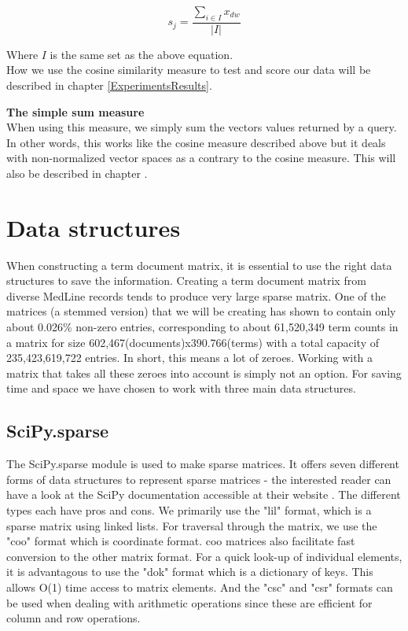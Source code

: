 \[
s_j = \frac{\sum_{i \in I} x_{dw}}{|I|}
\]

Where $I$ is the same set as the above equation. \\

How we use the cosine similarity measure to test and score our data will be described in chapter \ref{ExperimentsResults}. \\


\textbf{The simple sum measure\label{SimpleSum}} \\
When using this measure, we simply sum the vectors values returned by
a query. In other words, this works like the cosine measure described
above but it deals with non-normalized vector spaces as a contrary to
the cosine measure. This will also be described in chapter
.

\section{Data structures}

When constructing a term document matrix, it is essential to use the
right data structures to save the information. Creating a term
document matrix from diverse MedLine records tends to produce very
large sparse matrix. One of the matrices (a stemmed version) that we
will be creating has shown to contain only about 0.026\% non-zero
entries, corresponding to about 61,520,349 term counts in a matrix for
size 602,467(documents)x390.766(terms) with a total capacity of
235,423,619,722 entries. In short, this means a lot of zeroes. Working
with a matrix that takes all these zeroes into account is simply not
an option. For saving time and space we have chosen to work with three
main data structures.

\subsection{SciPy.sparse\label{SciPy_sparse}}

The SciPy.sparse module is used to make sparse matrices. It offers
seven different forms of data structures to represent sparse matrices
- the interested reader can have a look at the SciPy documentation
accessible at their website \cite{SciPy}. The different types each have pros and
cons. We primarily use the "lil" format, which is a sparse matrix
using linked lists. For traversal through the matrix, we use the "coo"
format which is coordinate format. coo matrices also facilitate fast
conversion to the other matrix format. For a quick look-up of
individual elements, it is advantagous to use the "dok" format which
is a dictionary of keys. This allows O(1) time access to matrix
elements. And the "csc" and "csr" formats can be used when dealing
with arithmetic operations since these are efficient for column and
row operations. \\

